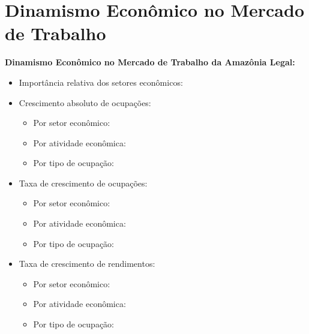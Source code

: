 \documentclass[10pt]{beamer}
\begin{document}
\section{Dinamismo Econômico no Mercado de Trabalho}

\begin{frame}[label=indice_principal_amz]{}

\textit{\hyperlink{indice_principal}{}}

\textbf{Dinamismo Econômico no Mercado de Trabalho da Amazônia Legal:}
\vspace{2mm}
\begin{itemize}

\item{Importância relativa dos setores econômicos: \hyperlink{_importancia_relativa}{}}
\vspace{1mm}

\item{Crescimento  absoluto de ocupações:
	\begin{itemize}
	\item{Por setor econômico: \hyperlink{rkngnocuporsetor}{}}
	\item{Por atividade econômica: \hyperlink{rkngnocuporatividade}{}}
	\item{Por tipo de ocupação: \hyperlink{rkngnocuporocupacao}{}}
	\end{itemize}
}
\vspace{1mm}

\item{Taxa de crescimento de ocupações:
	\begin{itemize}
	\item{Por setor econômico: \hyperlink{rkngtxocuporsetor}{}}
	\item{Por atividade econômica: \hyperlink{rkngtxocuporatividade}{}}
	\item{Por tipo de ocupação: \hyperlink{rkngtxocuporocupacao}{}}
	\end{itemize}
}
\vspace{1mm}

\item{Taxa de crescimento de rendimentos:
	\begin{itemize}
	\item{Por setor econômico: \hyperlink{rkngtxrendaporsetor}{}}
	\item{Por atividade econômica: \hyperlink{rkngtxrendaporatividade}{}}
	\item{Por tipo de ocupação: \hyperlink{rkngtxrendaporocupacao}{}}
	\end{itemize}
}
\vspace{1mm}

\end{itemize}

\end{frame}
\end{document}
